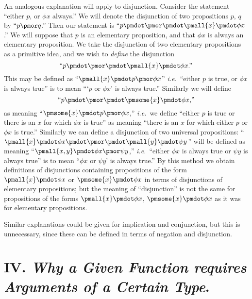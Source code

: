 \documentclass[letterpaper,12pt,openany,leqno]{book}
\newcommand{\pagefirst}[1]{\marginnote[\boxed{\text{#1}}]{\boxed{\text{#1}}}}
\begin{document}
An analogous explanation will apply to disjunction. Consider the statement ``either $p$, or $\phi x$ always.'' We will denote the disjunction of two propositions $p$, $q$ by ``$p \pmor q$.'' Then our statement is ``$p \pmdot \pmor \pmdot \pmall{x} \pmdot \phi x$.'' We will suppose that $p$ is an elementary proposition, and that $\phi x$ is always an elementary proposition. We take the disjunction of two elementary propositions as a primitive idea, and we wish to \textit{define} the disjunction
\[
	\text{``}p \pmdot \pmor \pmdot \pmall{x} \pmdot \phi x\text{.''}
\]
This may be defined as ``$\pmall{x} \pmdot p \pmor \phi x$'' \textit{i.e.}\ ``either $p$ is true, or $\phi x$ is always true'' is to mean ```$p$ or $\phi x$' is always true.'' Similarly we will define
\[
	\text{``}p \pmdot \pmor \pmdot \pmsome{x} \pmdot \phi x\text{,''}
\]
as meaning ``$\pmsome{x} \pmdot p \pmor \phi x$,'' \textit{i.e.}\ we define ``either $p$ is true or there is an $x$ for which $\phi x$ is true'' as meaning ``there is an $x$ for which either $p$ or $\phi x$ is true.'' Similarly we can define a disjunction of two universal propositions: ``$\pmall{x} \pmdot \phi x \pmdot \pmor \pmdot \pmall{y} \pmdot \psi y$'' will be defined as meaning ``$\pmall{x, y}\pmdot \phi x \pmor \psi y$,'' \textit{i.e.}\ ``either $\phi x$ is always true or $\psi y$ is always true'' is to mean ``$\phi x$ or $\psi y$' is always true.'' By this method we obtain definitions of disjunctions containing propositions of the form $\pmall{x}\pmdot \phi x$ or $\pmsome{x}\pmdot \phi x$ in terms of disjunctions of elementary propositions; but the meaning of ``disjunction'' is not the \pagefirst{50} same for propositions of the forms $\pmall{x}\pmdot \phi x$, $\pmsome{x}\pmdot \phi x$ as it was for elementary propositions.

Similar explanations could be given for implication and conjunction, but this is unnecessary, since these can be defined in terms of negation and disjunction.

\section*{\centering IV. \textit{Why a Given Function requires Arguments of a Certain Type}.}
 
\end{document}
